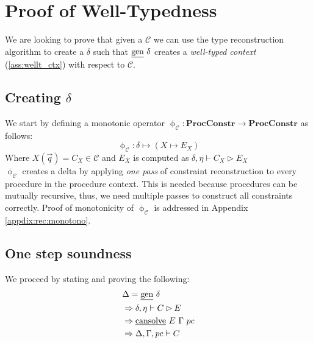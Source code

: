 \documentclass[12pt,a4paper,twoside]{book}
\begin{document}
\section{Proof of Well-Typedness}
We are looking to prove that given a $\mathscr{C}$ we can use the type reconstruction algorithm to create a $\delta$ such that $\text{\underline{gen}} ~\delta$ creates a \emph{well-typed context} (\ref{ass:wellt_ctx}) with respect to $\mathscr{C}$.

\subsection{Creating $\delta$}
We start by defining a monotonic operator $\upphi_\mathscr{C}: \textbf{ProcConstr} \rightarrow \textbf{ProcConstr}$ as follows:
$$
\upphi_\mathscr{C}: \delta \mapsto (X \mapsto E_X)
$$
Where $X(\vec{q}) = C_X \in \mathscr{C}$ and $E_X$ is computed as $\delta, \eta\vdash C_X \rhd E_X$\\
$\upphi_\mathscr{C}$ creates a delta by applying \emph{one pass} of constraint reconstruction to every procedure in the procedure context. This is needed because procedures can be mutually recursive, thus, we need multiple passes to construct all constraints correctly. Proof of monotonicity of $\upphi_\mathscr{C}$ is addressed in Appendix \ref{appdix:rec:monotono}.
\subsection{One step soundness}
We proceed by stating and proving the following:
\begin{align}
\begin{split}\label{rec:one_step}
&\Delta = \text{\underline{gen}}~\delta\\
&\Rightarrow \delta, \eta \vdash C \rhd E\\
&\Rightarrow \text{\underline{cansolve}}~E~\Gamma~pc\\
&\Rightarrow \Delta, \Gamma, pc \vdash C
\end{split}
\end{align}
\end{document}
